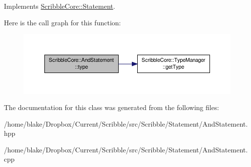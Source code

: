 Implements \hyperlink{class_scribble_core_1_1_statement}{Scribble\-Core\-::\-Statement}.



Here is the call graph for this function\-:\nopagebreak
\begin{figure}[H]
\begin{center}
\leavevmode
\includegraphics[width=350pt]{class_scribble_core_1_1_and_statement_a957b93b036c51ac746c18ad7fbfcda71_cgraph}
\end{center}
\end{figure}




The documentation for this class was generated from the following files\-:\begin{DoxyCompactItemize}
\item 
/home/blake/\-Dropbox/\-Current/\-Scribble/src/\-Scribble/\-Statement/And\-Statement.\-hpp\item 
/home/blake/\-Dropbox/\-Current/\-Scribble/src/\-Scribble/\-Statement/And\-Statement.\-cpp\end{DoxyCompactItemize}
